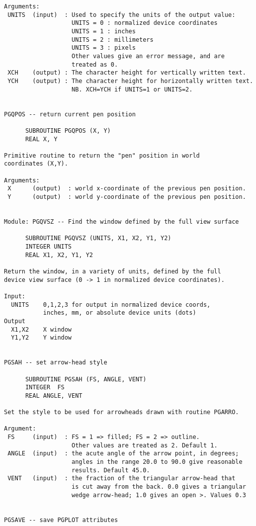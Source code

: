 \begin{small}
\begin{verbatim}
Arguments:
 UNITS  (input)  : Used to specify the units of the output value:
                   UNITS = 0 : normalized device coordinates
                   UNITS = 1 : inches
                   UNITS = 2 : millimeters
                   UNITS = 3 : pixels
                   Other values give an error message, and are
                   treated as 0.
 XCH    (output) : The character height for vertically written text.
 YCH    (output) : The character height for horizontally written text.
                   NB. XCH=YCH if UNITS=1 or UNITS=2.


PGQPOS -- return current pen position

      SUBROUTINE PGQPOS (X, Y)
      REAL X, Y
 
Primitive routine to return the "pen" position in world
coordinates (X,Y).
 
Arguments:
 X      (output)  : world x-coordinate of the previous pen position.
 Y      (output)  : world y-coordinate of the previous pen position.


Module: PGQVSZ -- Find the window defined by the full view surface

      SUBROUTINE PGQVSZ (UNITS, X1, X2, Y1, Y2)
      INTEGER UNITS
      REAL X1, X2, Y1, Y2

Return the window, in a variety of units, defined by the full
device view surface (0 -> 1 in normalized device coordinates).

Input:
  UNITS    0,1,2,3 for output in normalized device coords,
           inches, mm, or absolute device units (dots)
Output
  X1,X2    X window
  Y1,Y2    Y window


PGSAH -- set arrow-head style

      SUBROUTINE PGSAH (FS, ANGLE, VENT)
      INTEGER  FS
      REAL ANGLE, VENT

Set the style to be used for arrowheads drawn with routine PGARRO.

Argument:
 FS     (input)  : FS = 1 => filled; FS = 2 => outline.
                   Other values are treated as 2. Default 1.
 ANGLE  (input)  : the acute angle of the arrow point, in degrees;
                   angles in the range 20.0 to 90.0 give reasonable
                   results. Default 45.0.
 VENT   (input)  : the fraction of the triangular arrow-head that
                   is cut away from the back. 0.0 gives a triangular
                   wedge arrow-head; 1.0 gives an open >. Values 0.3


PGSAVE -- save PGPLOT attributes


\end{verbatim}
\end{small}
